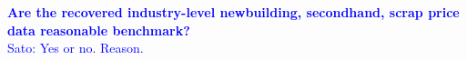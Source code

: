\documentclass[11pt]{article}
\begin{document}


\textcolor{blue}{
\textbf{Are the recovered industry-level newbuilding, secondhand, scrap price data reasonable benchmark?} \\
Sato: Yes or no. Reason.
}






\end{document}
